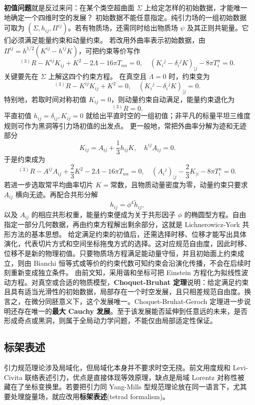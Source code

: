 \textbf{初值问题}就是反过来问：在某个类空超曲面 $\Sigma$ 上给定怎样的初始数据，才能唯一地确定一个四维时空的发展？
初始数据不能任意指定。纯引力场的一组初始数据可取为 $(\Sigma,h_{ij},\Pi^{ij})$。若有物质场，还需同时给出物质场 $\psi$ 及其正则共轭量。它们必须满足能量约束和动量约束。
若改用外曲率表示初始数据，由 $\Pi^{ij}=h^{1/2}(K^{ij}-h^{ij}K)$，可把约束等价写作
\[
    {}^{(3)}R-K^{ij}K_{ij}+K^2-2\Lambda-16\pi T_{nn}=0,\quad (K_i{}^j-\delta_i{}^jK)_{|j}-8\pi T_i^n=0.
\]
关键要先在 $\Sigma$ 上解这四个约束方程。
在真空且 $\Lambda=0$ 时，约束变为
\[
    {}^{(3)}R-K^{ij}K_{ij}+K^2=0,\quad
    (K_i{}^j-\delta_i{}^jK)_{|j}=0.
\]
特别地，若取时间对称初值 $K_{ij}=0$，则动量约束自动满足，能量约束退化为
\[
    {}^{(3)}R=0.
\]
平直初值 $h_{ij}=\delta_{ij},K_{ij}=0$ 就给出平直时空的一组初值；非平凡的标量平坦三维度规则可作为黑洞等引力场初值的出发点。
更一般地，常把外曲率分解为迹和无迹部分
\[
    K_{ij}=A_{ij}+\frac{1}{3}h_{ij}K,\quad h^{ij}A_{ij}=0.
\]
于是约束成为
\[
    {}^{(3)}R-A^{ij}A_{ij}+\frac{2}{3}K^2-2\Lambda-16\pi T_{nn}=0,\quad (A_i{}^j)_{|j}-\frac{2}{3}K_{|i}-8\pi T_i^n=0.
\]
若进一步选取常平均曲率切片 $K=\text{常数}$，且物质动量密度为零，动量约束只要求 $A_{ij}$ 横向无迹。再配合共形分解
\[
    h_{ij}=\phi^4\tilde h_{ij},
\]
以及 $A_{ij}$ 的相应共形权重，能量约束便成为关于共形因子 $\phi$ 的椭圆型方程。自由指定一部分几何数据，再由约束方程解出剩余部分，这就是 Lichnerowicz-York 共形方法的基本思想。
给定满足约束的初值后，还需选择时移、位移才能写出具体演化，代表切片方式和空间坐标拖曳方式的选择。这对应规范自由度，因此时移、位移不是新的物理初值。只要物质场方程满足能动量守恒，并且初始面上约束成立，则由 Bianchi 恒等式或等价的约束代数可知约束会沿演化传播，不会在后续时刻重新变成独立条件。
由前文知，采用谐和坐标可把 Einstein 方程化为拟线性波动方程。对真空或合适的物质模型，\textbf{Choquet-Bruhat 定理}说明：给定满足约束且具有适当光滑性的初始数据，局部存在一个时空发展，且只相差规范自由度。换言之，在微分同胚意义下，这个发展唯一。Choquet-Bruhat-Geroch 定理进一步说明还存在唯一的\textbf{最大 Cauchy 发展}。至于该发展能否延伸到任意远的未来，是否形成奇点或黑洞，则属于全局动力学问题，不能仅由局部适定性保证。

\subsection{标架表述}\label{sec:tetrad}

引力规范理论涉及局域化，但局域化本身并不要求时空无挠。前文用度规和 Levi-Civita 联络表述引力，优点是直接体现等效原理，缺点是局域 Lorentz 对称性被藏在了坐标变换里。若要把引力同 Yang-Mills 型规范理论放在同一语言下，尤其要处理旋量场，就应改用\textbf{标架表述}(tetrad formalism)。

